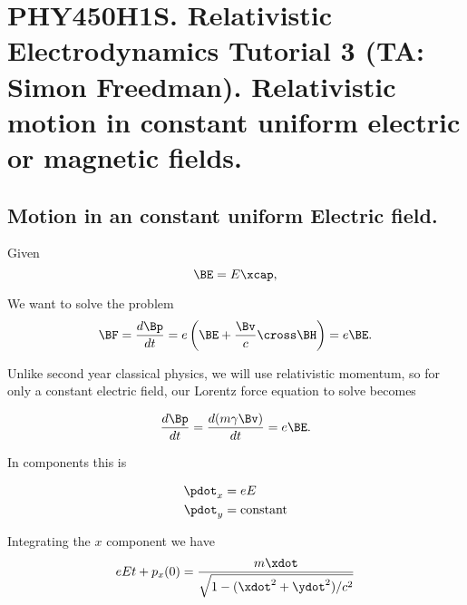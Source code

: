 
%

\chapter{PHY450H1S.  Relativistic Electrodynamics Tutorial 3 (TA: Simon Freedman).  Relativistic motion in constant uniform electric or magnetic fields.}
\label{chap:relativisticElectrodynamicsT3}
{}
\date{Feb 3, 2011}

\beginArtWithToc

\section{Motion in an constant uniform Electric field.}

Given
\begin{equation}\label{eqn:relativisticElectrodynamicsT3:}
\BE = E \xcap,
\end{equation}

We want to solve the problem
\begin{equation}\label{eqn:relativisticElectrodynamicsT3:20}
\BF = \frac{d\Bp}{dt} =
e \left( \BE + \frac{\Bv}{c} \cross \BH \right) = e \BE.
\end{equation}

Unlike second year classical physics, we will use relativistic momentum, so for only a constant electric field, our Lorentz force equation to solve becomes

\begin{equation}\label{eqn:relativisticElectrodynamicsT3:40}
\frac{d\Bp}{dt} = \frac{d (m \gamma \Bv)}{dt} = e \BE.
\end{equation}

In components this is

\begin{align}\label{eqn:relativisticElectrodynamicsT3:60}
\pdot_x &= e E \\
\pdot_y &= \text{constant}
\end{align}

Integrating the $x$ component we have
\begin{equation}\label{eqn:relativisticElectrodynamicsT3:65}
e E t + p_x(0)
=
\frac{m \xdot}{\sqrt{1 - (\xdot^2 + \ydot^2)/c^2}} 
\end{equation}

